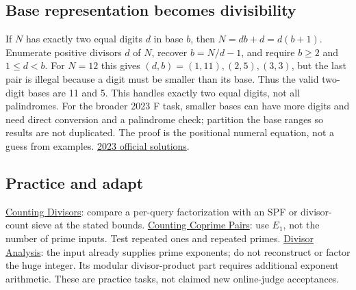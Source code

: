 \subsection{Base representation becomes divisibility}
If $N$ has exactly two equal digits $d$ in base $b$, then
$N=db+d=d(b+1)$. Enumerate positive divisors $d$ of $N$, recover
$b=N/d-1$, and require $b\ge2$ and $1\le d<b$. For $N=12$ this gives
$(d,b)=(1,11),(2,5),(3,3)$, but the last pair is illegal because a digit
must be smaller than its base. Thus the valid two-digit bases are 11 and 5.
This handles exactly two equal digits, not all palindromes. For the broader
2023 F task, smaller bases can have more digits and need direct conversion
and a palindrome check; partition the base ranges so results are not duplicated.
The proof is the positional numeral equation, not a guess from examples.
\href{https://icpcarchive.github.io/Latin%20American%20Contests/Latin%20American%20Regional%20Contest/2023%20Latin%20American%20Regional%20Contest/solution.pdf}{2023 official solutions}.

\subsection{Practice and adapt}
\href{https://cses.fi/problemset/task/1713}{Counting Divisors}: compare a
per-query factorization with an SPF or divisor-count sieve at the stated bounds.
\href{https://cses.fi/problemset/task/2417}{Counting Coprime Pairs}: use
$E_1$, not the number of prime inputs. Test repeated ones and repeated primes.
\href{https://cses.fi/problemset/task/2182}{Divisor Analysis}: the input
already supplies prime exponents; do not reconstruct or factor the huge integer.
Its modular divisor-product part requires additional exponent arithmetic.
These are practice tasks, not claimed new online-judge acceptances.
